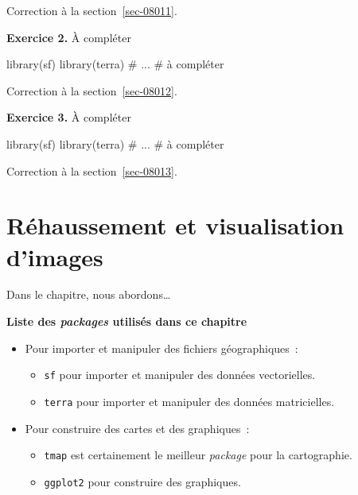 \documentclass[
  letterpaper,
  DIV=11,
  numbers=noendperiod]{scrreprt}
\newenvironment{Shaded}{\begin{snugshade}}{\end{snugshade}}
\newcommand{\CommentTok}[1]{\textcolor[rgb]{0.37,0.37,0.37}{#1}}
\newcommand{\NormalTok}[1]{\textcolor[rgb]{0.00,0.23,0.31}{#1}}
\providecommand{\tightlist}{%
  \setlength{\itemsep}{0pt}\setlength{\parskip}{0pt}}\usepackage{longtable,booktabs,array}
\begin{document}
Correction à la section~\ref{sec-08011}.

\textbf{Exercice 2.} À compléter

\begin{Shaded}
\begin{Highlighting}[]
\NormalTok{library(sf)}
\NormalTok{library(terra)}
\CommentTok{\# ...}
\CommentTok{\# à compléter}
\end{Highlighting}
\end{Shaded}

Correction à la section~\ref{sec-08012}.

\textbf{Exercice 3.} À compléter

\begin{Shaded}
\begin{Highlighting}[]
\NormalTok{library(sf)}
\NormalTok{library(terra)}
\CommentTok{\# ...}
\CommentTok{\# à compléter}
\end{Highlighting}
\end{Shaded}

Correction à la section~\ref{sec-08013}.


\chapter{Réhaussement et visualisation d'images}\label{sec-chap02}

Dans le chapitre, nous abordons\ldots{}

\textbf{Liste des \emph{packages} utilisés dans ce chapitre}

\begin{itemize}
\tightlist
\item
  Pour importer et manipuler des fichiers géographiques~:

  \begin{itemize}
  \tightlist
  \item
    \texttt{sf} pour importer et manipuler des données vectorielles.
  \item
    \texttt{terra} pour importer et manipuler des données matricielles.
  \end{itemize}
\item
  Pour construire des cartes et des graphiques~:

  \begin{itemize}
  \tightlist
  \item
    \texttt{tmap} est certainement le meilleur \emph{package} pour la
    cartographie.
  \item
    \texttt{ggplot2} pour construire des graphiques.
  \end{itemize}
\end{itemize}
\end{document}
